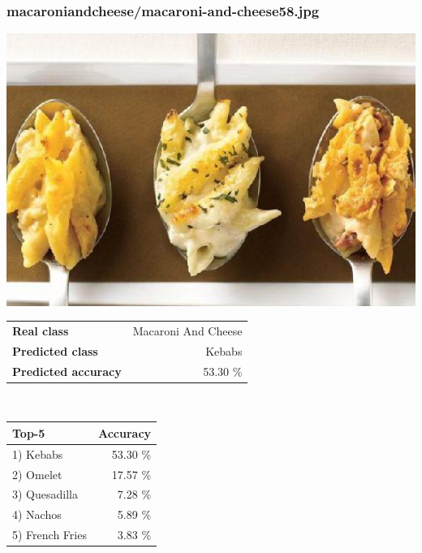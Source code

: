 \subsubsection{macaroni\textunderscore and\textunderscore cheese/macaroni-and-cheese58.jpg}

\begin{minipage}[t]{0.4\textwidth}
	\vspace{0pt}
	\includegraphics[width=\linewidth]{images/evaluation-images/macaroni_and_cheese/macaroni-and-cheese58.jpg}
\end{minipage}
\hfill
\begin{minipage}[t]{0.5\textwidth}
	\vspace{0pt}\raggedright
	\begin{tabularx}{\textwidth}{X r}
		\small \textbf{Real class} & \small Macaroni And Cheese\\
		\small \textbf{Predicted class} & \small Kebabs\\
		\small \textbf{Predicted accuracy} & \small 53.30 \%
    \end{tabularx}\\
    
    \vspace{6pt}
	\begin{tabularx}{\textwidth}{X r}
        \small \textbf{Top-5} & \small \textbf{Accuracy} \\
        \hline
		\small 1) Kebabs & \small 53.30 \%\\\small 2) Omelet & \small 17.57 \%\\\small 3) Quesadilla & \small 7.28 \%\\\small 4) Nachos & \small 5.89 \%\\\small 5) French Fries & \small 3.83 \%
    \end{tabularx}
\end{minipage}
    
